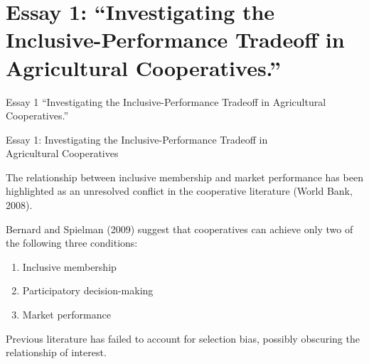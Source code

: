 \documentclass[aspectratio=169]{beamer}
\newenvironment{wideitemize}{\itemize\addtolength{\itemsep}{10pt}}{\enditemize}
\begin{document}
\section{Essay 1: ``Investigating the Inclusive-Performance Tradeoff in Agricultural Cooperatives.''}
\begin{frame}{Essay 1}
\centering
\Large{``Investigating the Inclusive-Performance Tradeoff in Agricultural Cooperatives.''}
\end{frame}


\begin{frame}{Essay 1: Investigating the Inclusive-Performance Tradeoff in \\ \hspace{1.7cm} Agricultural Cooperatives}

    \begin{wideitemize}
        \item The relationship between inclusive membership and market performance has been highlighted as an unresolved conflict in the cooperative literature (World Bank, 2008). 
        \item Bernard and Spielman (2009) suggest that cooperatives can achieve only two of the following three conditions: \vspace{.25cm}
            \begin{enumerate}
                \item Inclusive membership \vspace{.25cm}
                \item Participatory decision-making \vspace{.25cm}
                \item Market performance
            \end{enumerate}
        \item Previous literature has failed to account for selection bias, possibly obscuring the relationship of interest. 
    \end{wideitemize}
\end{frame}
\end{document}

